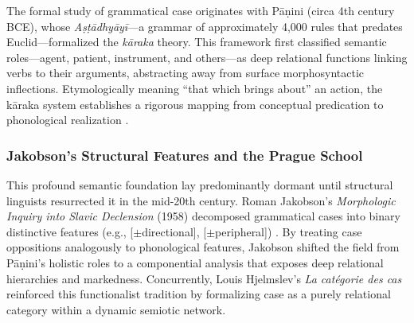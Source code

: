 \documentclass[
]{article}
\begin{document}
The formal study of grammatical case originates with Pāṇini (circa 4th
century BCE), whose \emph{Aṣṭādhyāyī}---a grammar of approximately 4,000
rules that predates Euclid---formalized the \emph{kāraka} theory. This
framework first classified semantic roles---agent, patient, instrument,
and others---as deep relational functions linking verbs to their
arguments, abstracting away from surface morphosyntactic inflections.
Etymologically meaning ``that which brings about'' an action, the kāraka
system establishes a rigorous mapping from conceptual predication to
phonological realization
\citetext{\citeyear{jha2021sanskrit}; \citeyear{kak1987paninian}}.

\subsubsection{Jakobson's Structural Features and the Prague
School}\label{jakobsons-structural-features-and-the-prague-school}

This profound semantic foundation lay predominantly dormant until
structural linguists resurrected it in the mid-20th century. Roman
Jakobson's \emph{Morphologic Inquiry into Slavic Declension} (1958)
decomposed grammatical cases into binary distinctive features (e.g.,
{[}\texorpdfstring{\ensuremath{\pm}}{+/-}directional{]}, {[}\texorpdfstring{\ensuremath{\pm}}{+/-}peripheral{]})
\citeyearpar{jakobson1958morphologic}. By treating case oppositions
analogously to phonological features, Jakobson shifted the field from
Pāṇini's holistic roles to a componential analysis that exposes deep
relational hierarchies and markedness. Concurrently, Louis Hjelmslev's
\emph{La catégorie des cas} \citeyearpar{hjelmslev1935categorie}
reinforced this functionalist tradition by formalizing case as a purely
relational category within a dynamic semiotic network.
\end{document}
